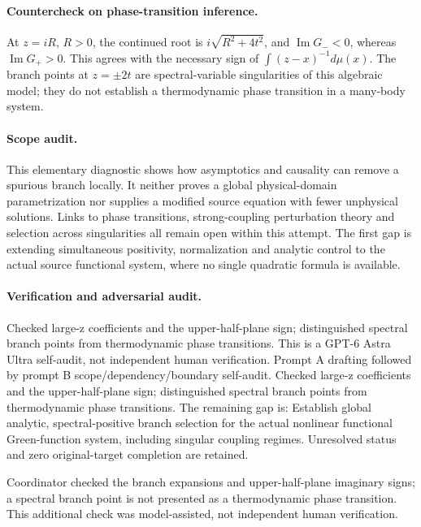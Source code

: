 \documentclass[11pt]{article}
\begin{document}
\paragraph{Countercheck on phase-transition inference.} At \(z=iR\), \(R>0\), the continued root is \(i\sqrt{R^2+4t^2}\), and \(\operatorname{Im}G_-<0\), whereas \(\operatorname{Im}G_+>0\). This agrees with the necessary sign of \(\int(z-x)^{-1}d\mu(x)\). The branch points at \(z=\pm2t\) are spectral-variable singularities of this algebraic model; they do not establish a thermodynamic phase transition in a many-body system.
\paragraph{Scope audit.} This elementary diagnostic shows how asymptotics and causality can remove a spurious branch locally. It neither proves a global physical-domain parametrization nor supplies a modified source equation with fewer unphysical solutions. Links to phase transitions, strong-coupling perturbation theory and selection across singularities all remain open within this attempt. The first gap is extending simultaneous positivity, normalization and analytic control to the actual source functional system, where no single quadratic formula is available.

\paragraph{Verification and adversarial audit.}
Checked large-z coefficients and the upper-half-plane sign; distinguished spectral branch points from thermodynamic phase transitions. This is a GPT-6 Astra Ultra self-audit, not independent human verification. Prompt A drafting followed by prompt B scope/dependency/boundary self-audit. Checked large-z coefficients and the upper-half-plane sign; distinguished spectral branch points from thermodynamic phase transitions. The remaining gap is: Establish global analytic, spectral-positive branch selection for the actual nonlinear functional Green-function system, including singular coupling regimes. Unresolved status and zero original-target completion are retained.

Coordinator checked the branch expansions and upper-half-plane imaginary signs; a spectral branch point is not presented as a thermodynamic phase transition. This additional check was model-assisted, not independent human verification.
\end{document}

